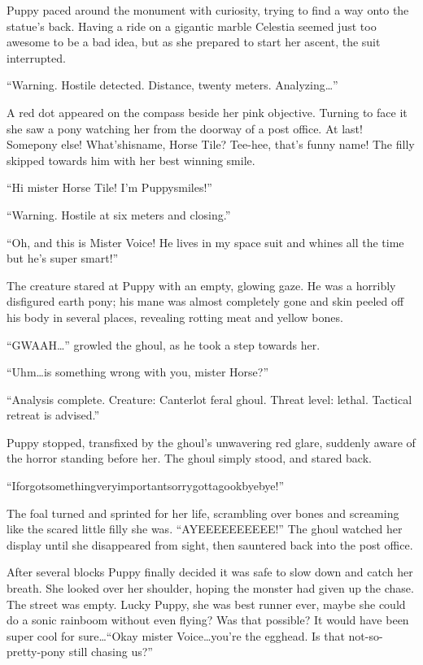 Puppy paced around the monument with curiosity, trying to find a way onto the statue's back. Having a ride on a gigantic marble Celestia seemed just too awesome to be a bad idea, but as she prepared to start her ascent, the suit interrupted.

``{\mt Warning. Hostile detected. Distance, twenty meters. Analyzing\dots}''

A red dot appeared on the compass beside her pink objective. Turning to face it she saw a pony watching her from the doorway of a post office. At last! Somepony else! What'shisname, Horse Tile? Tee-hee, that's funny name! The filly skipped towards him with her best winning smile.

``Hi mister Horse Tile! I'm Puppysmiles!''

``{\mt Warning. Hostile at six meters and closing.}''

``Oh, and this is Mister Voice! He lives in my space suit and whines all the time but he's super smart!''

The creature stared at Puppy with an empty, glowing gaze. He was a horribly disfigured earth pony; his mane was almost completely gone and skin peeled off his body in several places, revealing rotting meat and yellow bones.

``GWAAH\dots'' growled the ghoul, as he took a step towards her.

``Uhm\dots is something wrong with you, mister Horse?''

``{\mt Analysis complete. Creature: Canterlot feral ghoul. Threat level: lethal. Tactical retreat is advised.}''

Puppy stopped, transfixed by the ghoul's unwavering red glare, suddenly aware of the horror standing before her. The ghoul simply stood, and stared back.

``Iforgotsomethingveryimportantsorrygottagookbyebye!''

The foal turned and sprinted for her life, scrambling over bones and screaming like the scared little filly she was. ``AYEEEEEEEEEE!'' The ghoul watched her display until she disappeared from sight, then sauntered back into the post office.

After several blocks Puppy finally decided it was safe to slow down and catch her breath. She looked over her shoulder, hoping the monster had given up the chase. The street was empty. Lucky Puppy, she was best runner ever, maybe she could do a sonic rainboom without even flying? Was that possible? It would have been super cool for sure\dots ``Okay mister Voice\dots you're the egghead. Is that not-so-pretty-pony still chasing us?''

